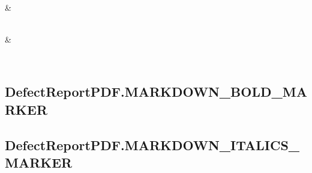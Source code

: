 \documentclass[letterpaper,10pt,english]{sphinxmanual}
\begin{document}
\begin{fulllineitems}
\begin{savenotes}
\begin{longtable}[c]{}
\\
\hline
\sphinxAtStartPar
{\hyperref[\detokenize{generated/quality_assessment.quality_pdf_report.DefectReportPDF.underline:quality_assessment.quality_pdf_report.DefectReportPDF.underline}]{}}
&
\sphinxAtStartPar

\\
\hline
\sphinxAtStartPar
{\hyperref[\detokenize{generated/quality_assessment.quality_pdf_report.DefectReportPDF.unifontsubset:quality_assessment.quality_pdf_report.DefectReportPDF.unifontsubset}]{}}
&
\sphinxAtStartPar

\\
\hline
\end{longtable}\sphinxatlongtableend\end{savenotes}


\subsection{DefectReportPDF.MARKDOWN\_BOLD\_MARKER}
\label{\detokenize{generated/quality_assessment.quality_pdf_report.DefectReportPDF.MARKDOWN_BOLD_MARKER:defectreportpdf-markdown-bold-marker}}\label{\detokenize{generated/quality_assessment.quality_pdf_report.DefectReportPDF.MARKDOWN_BOLD_MARKER::doc}}

\begin{fulllineitems}
\label{\detokenize{generated/quality_assessment.quality_pdf_report.DefectReportPDF.MARKDOWN_BOLD_MARKER:quality_assessment.quality_pdf_report.DefectReportPDF.MARKDOWN_BOLD_MARKER}}
\end{fulllineitems}



\subsection{DefectReportPDF.MARKDOWN\_ITALICS\_MARKER}
\label{\detokenize{generated/quality_assessment.quality_pdf_report.DefectReportPDF.MARKDOWN_ITALICS_MARKER:defectreportpdf-markdown-italics-marker}}\label{\detokenize{generated/quality_assessment.quality_pdf_report.DefectReportPDF.MARKDOWN_ITALICS_MARKER::doc}}


\end{fulllineitems}
\end{document}
